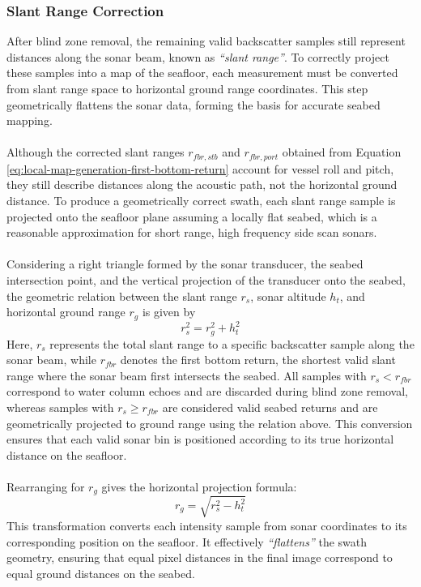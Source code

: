 \subsubsection{Slant Range Correction}
After blind zone removal, the remaining valid backscatter samples still represent distances along the sonar beam, known as \textit{``slant range''}. To correctly project these samples into a map of the seafloor, each measurement must be converted from slant range space to horizontal ground range coordinates. This step geometrically flattens the sonar data, forming the basis for accurate seabed mapping.
\\ \\
Although the corrected slant ranges $r_{fbr,stb}$ and $r_{fbr,port}$ obtained from Equation \ref{eq:local-map-generation-first-bottom-return} account for vessel roll and pitch, they still describe distances along the acoustic path, not the horizontal ground distance. To produce a geometrically correct swath, each slant range sample is projected onto the seafloor plane assuming a locally flat seabed, which is a reasonable approximation for short range, high frequency side scan sonars.
\\ \\
Considering a right triangle formed by the sonar transducer, the seabed intersection point, and the vertical projection of the transducer onto the seabed, the geometric relation between the slant range $r_s$, sonar altitude $h_t$, and horizontal ground range $r_g$ is given by
$$
    r_s^2 = r_g^2 + h_t^2
$$
Here, $r_s$ represents the total slant range to a specific backscatter sample along the sonar beam, while $r_{fbr}$ denotes the first bottom return, the shortest valid slant range where the sonar beam first intersects the seabed. All samples with $r_s < r_{fbr}$ correspond to water column echoes and are discarded during blind zone removal, whereas samples with $r_s \ge r_{fbr}$ are considered valid seabed returns and are geometrically projected to ground range using the relation above. This conversion ensures that each valid sonar bin is positioned according to its true horizontal distance on the seafloor.
\\ \\
Rearranging for $r_g$ gives the horizontal projection formula:
$$
    r_g = \sqrt{r_s^2 - h_t^2}
$$
This transformation converts each intensity sample from sonar coordinates to its corresponding position on the seafloor. It effectively \textit{``flattens''} the swath geometry, ensuring that equal pixel distances in the final image correspond to equal ground distances on the seabed.
